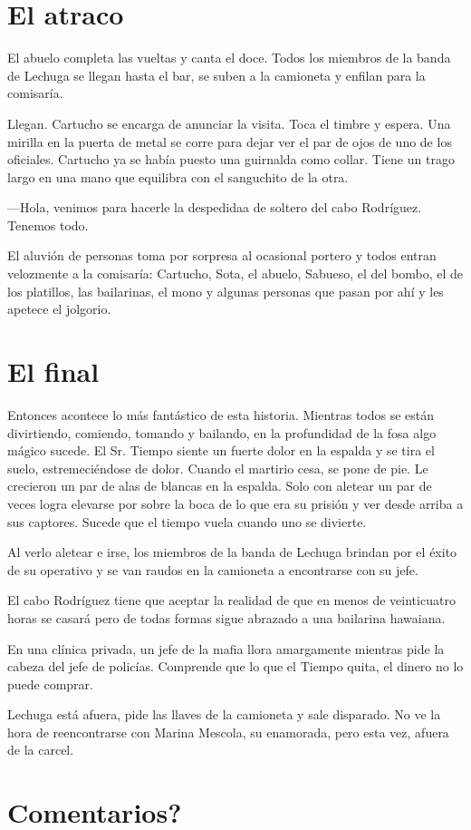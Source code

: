\chapter*{El atraco}

El abuelo completa las vueltas y canta el doce. Todos los miembros de la banda de Lechuga se llegan hasta el bar, se suben a la camioneta y enfilan para la comisaría.

Llegan. Cartucho se encarga de anunciar la visita. Toca el timbre y espera. Una mirilla en la puerta de metal se corre para dejar ver el par de ojos de uno de los oficiales. Cartucho ya se había puesto una guirnalda como collar. Tiene un trago largo en una mano que equilibra con el sanguchito de la otra.

---Hola, venimos para hacerle la despedidaa de soltero del cabo Rodríguez. Tenemos todo.

El aluvión de personas toma por sorpresa al ocasional portero y todos entran velozmente a la comisaría: Cartucho, Sota, el abuelo, Sabueso, el del bombo, el de los platillos, las bailarinas, el mono y algunas personas que pasan por ahí y les apetece el jolgorio.

\chapter*{El final}

Entonces acontece lo más fantástico de esta historia. Mientras todos se están divirtiendo, comiendo, tomando y bailando, en la profundidad de la fosa algo mágico sucede. El Sr. Tiempo siente un fuerte dolor en la espalda y se tira el suelo, estremeciéndose de dolor. Cuando el martirio cesa, se pone de pie. Le crecieron un par de alas de blancas en la espalda. Solo con aletear un par de veces logra elevarse por sobre la boca de lo que era su prisión y ver desde arriba a sus captores. Sucede que el tiempo vuela cuando uno se divierte.

Al verlo aletear e irse, los miembros de la banda de Lechuga brindan por el éxito de su operativo y se van raudos en la camioneta a encontrarse con su jefe. 

El cabo Rodríguez tiene que aceptar la realidad de que en menos de veinticuatro horas se casará pero de todas formas sigue abrazado a una bailarina hawaiana. 

En una clínica privada, un jefe de la mafia llora amargamente mientras pide la cabeza del jefe de policías. Comprende que lo que el Tiempo quita, el dinero no lo puede comprar.

Lechuga está afuera, pide las llaves de la camioneta y sale disparado. No ve la hora de reencontrarse con Marina Mescola, su enamorada, pero esta vez, afuera de la carcel.

\chapter*{Comentarios?}

\cleardoublepage
